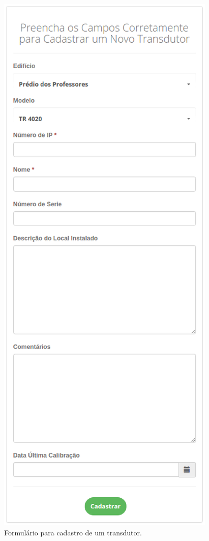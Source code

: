 \begin{anexosenv}
\begin{figure}[!htpb]
    \centering
    \includegraphics[keepaspectratio=true,scale=0.65]{figuras/img14.eps}
    \caption{Formulário para cadastro de um transdutor.}
    \label{img14}
\end{figure}

\end{anexosenv}